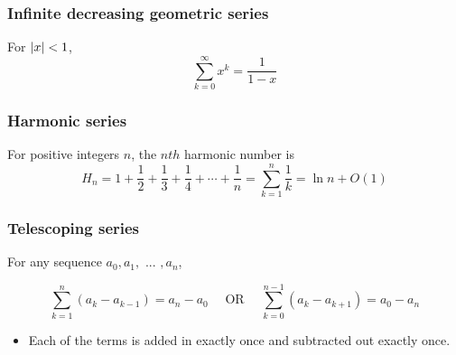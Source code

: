     \subsubsection{Infinite decreasing geometric series}
        \begin{definition}
            For $\abs{x} < 1$, 
            \begin{equation}
                \sum_{k=0}^{\infty} x^k = \frac{1}{1-x}
            \end{equation}
        \end{definition}

    \subsubsection{Harmonic series}
        \begin{definition}
            For positive integers $n$, the $nth$ harmonic number is
            \begin{equation}
                H_n = 1 + \frac{1}{2} + \frac{1}{3} + \frac{1}{4} + \cdots + \frac{1}{n} = \sum_{k=1}^{n} \frac{1}{k} = \ln n + O(1)
            \end{equation}                
        \end{definition}

    \subsubsection{Telescoping series}
        \begin{definition}
            For any sequence $a_0, a_1, \text{ ... }, a_n$,

            \begin{equation}
                \sum_{k=1}^{n} (a_k - a_{k-1}) = a_n - a_0 \quad \text{ OR } \quad \sum_{k=0}^{n-1} (a_k - a_{k+1}) = a_0 - a_n
            \end{equation}

            \begin{itemize}
                \item Each of the terms is added in exactly once and subtracted out exactly once.
            \end{itemize}

        \end{definition}

